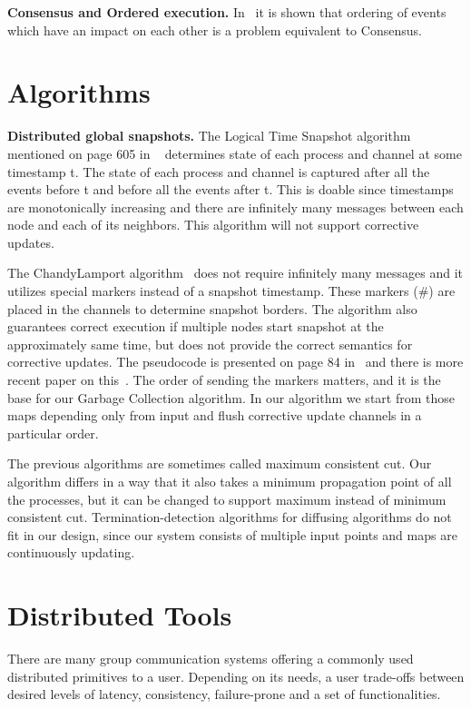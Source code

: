\documentclass{sig-semester}
\begin{document}
\textbf{Consensus and Ordered execution.} In~\cite{Schiper94} it is shown that ordering of events which have an impact on each other is a problem equivalent to Consensus.

\section{Algorithms}
\vspace{2mm}
\textbf{Distributed global snapshots.} The Logical Time Snapshot algorithm mentioned on page 605 in ~\cite{Lynch96} determines state of each process and channel at some timestamp t. The state of each process and channel is captured after all the events before t and before all the events after t. This is doable since timestamps are monotonically increasing and there are infinitely many messages between each node and each of its neighbors. This algorithm will not support corrective updates.

The ChandyLamport algorithm~\cite{Chandy85} does not require infinitely many messages and it utilizes special markers instead of a snapshot timestamp. These markers (\#) are placed in the channels to determine snapshot borders. The algorithm also guarantees correct execution if multiple nodes start snapshot at the approximately same time, but does not provide the correct semantics for corrective updates. The pseudocode is presented on page 84 in~\cite{wu99} and there is more recent paper on this~\cite{Ahuja90}. The order of sending the markers matters, and it is the base for our Garbage Collection algorithm. In our algorithm we start from those maps depending only from input and flush corrective update channels in a particular order.

The previous algorithms are sometimes called maximum consistent cut. Our algorithm differs in a way that it also takes a minimum propagation point of all the processes, but it can be changed to support maximum instead of minimum consistent cut. Termination-detection algorithms for diffusing algorithms do not fit in our design, since our system consists of multiple input points and maps are continuously updating.

\section{Distributed Tools}
\vspace{2mm}
There are many group communication systems offering a commonly used distributed primitives to a user. Depending on its needs, a user trade-offs between desired levels of latency, consistency, failure-prone and a set of functionalities.
\end{document}
